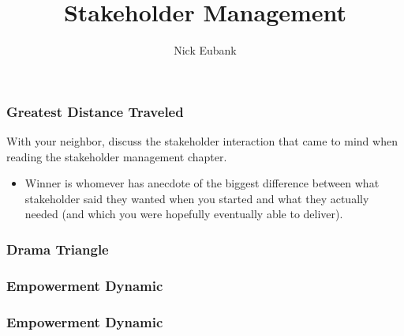 \documentclass[12pt]{beamer}
\title{Stakeholder Management}
\author{Nick Eubank}
\date{\vspace*{.3in} \date}
\begin{document}

\begin{frame}[c]{}
    \titlepage
\end{frame}
\begin{frame}
    \frametitle{Greatest Distance Traveled}
With your neighbor, discuss the stakeholder interaction that came to mind when reading the stakeholder management chapter.

\begin{itemize}
    \item Winner is whomever has anecdote of the biggest difference between what stakeholder \alert{said} they wanted when you started and what \alert{they actually needed} (and which you were hopefully eventually able to deliver).
\end{itemize}

\end{frame}

\begin{frame}
    \frametitle{Drama Triangle}
\pause 
\end{frame}



\begin{frame}
    \frametitle{Empowerment Dynamic}
\end{frame}

\begin{frame}
    \frametitle{Empowerment Dynamic}
\end{frame}
    
\end{document}
